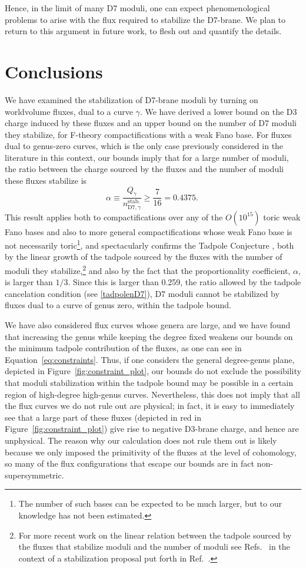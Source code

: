 \documentclass[a4paper,12pt]{article}
\numberwithin{equation}{section}
\newcommand{\be}{\begin{equation}}
\newcommand{\ee}{\end{equation}}
\newcommand{\crv}{\gamma}			%
\newcommand{\stbmod}[1]{n_{\mathrm{D7},{#1}}^\mathrm{stab.}}		%
\begin{document}
Hence, in the limit of many D7 moduli, one can expect  phenomenological problems to arise with the flux required to stabilize the D7-brane. We plan to return to this argument in future work, to flesh out and quantify the details.

\section{Conclusions}
\label{Conclusions}

We have examined the stabilization of D7-brane moduli by turning on worldvolume fluxes, dual to a curve $\crv$. We have derived a lower bound on the D3 charge induced by these fluxes and an upper bound on the number of D7 moduli they stabilize, for F-theory compactifications with a weak Fano base. For fluxes dual to genus-zero curves, which is the only case previously considered in the literature in this context, our bounds imply that for a large number of moduli, the ratio between the charge sourced by the fluxes and the number of moduli these fluxes stabilize is 
\be
\alpha\equiv \frac{Q_{\crv}}{\stbmod{\crv}} \ge \frac{7}{16}=0.4375. \nonumber \ 
\ee
This result applies both to compactifications over any of the $O(10^{15})$ toric weak Fano bases \cite{Halverson_2017} and also to more general compactifications whose weak Fano base is not necessarily toric\footnote{The number of such bases can be expected to be much larger, but to our knowledge has not been estimated.}, and spectacularly confirms the Tadpole Conjecture \cite{Bena:2020xrh}, both by the linear growth of the tadpole sourced by the fluxes with the number of moduli they stabilize,\footnote{For more recent work on the linear relation between the tadpole sourced by the fluxes that stabilize moduli and the number of moduli see Refs.~\cite{Plauschinn, Severin} in the context of a stabilization proposal put forth in Ref.~\cite{Marchesano}.}  and also by the fact that the proportionality coefficient, $\alpha$, is larger than $1/3$. Since this is larger than 0.259, the ratio allowed by the tadpole cancelation condition (see \eqref{tadpolenD7}), D7 moduli cannot be stabilized by fluxes dual to a curve of genus zero, within the tadpole bound.  

We have also considered flux curves whose genera are large, and we have found that increasing the genus while keeping the degree fixed weakens our bounds on the minimum tadpole contribution of the fluxes, as one can see in Equation~\eqref{eq:constraints}. Thus, if one considers the general degree-genus plane, depicted in Figure~\ref{fig:constraint_plot}, our bounds do not exclude the possibility that moduli stabilization within the tadpole bound may be possible in a certain region of high-degree high-genus curves. Nevertheless, this does not imply that all the flux curves we do not rule out are physical; in fact, it is easy to immediately see that a large part of these fluxes (depicted in red in Figure~\ref{fig:constraint_plot}) give rise to negative D3-brane charge, and hence are unphysical.
The reason why our calculation does not rule them out is likely because we  only imposed the primitivity of the fluxes at the level of cohomology, so many of the flux configurations that escape our bounds are in fact non-supersymmetric.
\end{document}
